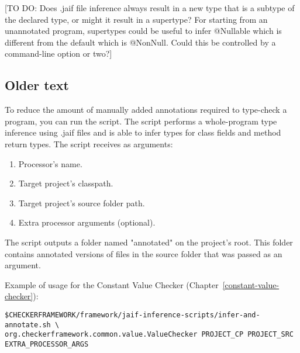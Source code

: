 [TO DO:  Does .jaif file inference always result in a new type that is a
  subtype of the declared type, or might it result in a supertype?  For
  starting from an unannotated program, supertypes could be useful to infer
  @Nullable which is different from the default which is @NonNull.  Could
  this be controlled by a command-line option or two?]


\subsection{Older text}

To reduce the amount of manually added annotations required to
type-check a program, you can run the  script.
The script performs a whole-program type inference using .jaif files and is
able to infer types for class fields and method return types.
The script receives as arguments:

\begin{enumerate}
\item Processor's name.
\item Target project's classpath.
\item Target project's source folder path.
\item Extra processor arguments (optional).
\end{enumerate}

The script outputs a folder named "annotated" on the project's root.
This folder contains annotated versions of files in the source folder that
was passed as an argument.

Example of usage for the Constant Value Checker (Chapter~\ref{constant-value-checker}):
\begin{Verbatim}
$CHECKERFRAMEWORK/framework/jaif-inference-scripts/infer-and-annotate.sh \
org.checkerframework.common.value.ValueChecker PROJECT_CP PROJECT_SRC EXTRA_PROCESSOR_ARGS
\end{Verbatim}
